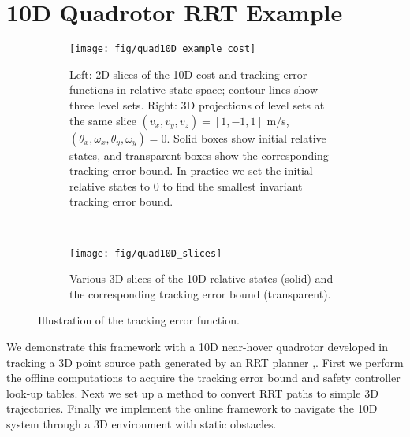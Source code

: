 \section{10D Quadrotor RRT Example \label{sec:results}}
\begin{figure*}
  \centering
  \begin{subfigure}{0.65\textwidth}
	  \texttt{[image: fig/quad10D\_example\_cost]}
	  \caption{Left: 2D slices of the 10D cost and tracking error functions in relative state space; contour lines show three level sets. Right: 3D projections of level sets at the same slice $(v_{x},v_{y},v_{z})=[1, -1, 1]$ m/s, $(\theta_{x},\omega_{x},\theta_{y},\omega_{y})=0$. Solid boxes show initial relative states, and transparent boxes show the corresponding tracking error bound. In practice we set the initial relative states to 0 to find the smallest invariant tracking error bound.\label{fig:quad10D_example}}
  \end{subfigure}~
  \begin{subfigure}{0.3\textwidth}
    \texttt{[image: fig/quad10D\_slices]}
    \caption{Various 3D slices of the 10D relative states (solid) and the corresponding tracking error bound (transparent). \label{fig:quad10D_example_slices}}
  \end{subfigure} 
  \caption{Illustration of the tracking error function.}
\end{figure*} 

We demonstrate this framework with a 10D near-hover quadrotor developed in \cite{Bouffard12} tracking a 3D point source path generated by an RRT planner \cite{Kuffner2000},\cite{Kavraki1996}. First we perform the offline computations to acquire the tracking error bound and safety controller look-up tables. Next we set up a method to convert RRT paths to simple 3D trajectories. Finally we implement the online framework to navigate the 10D system through a 3D environment with static obstacles.

